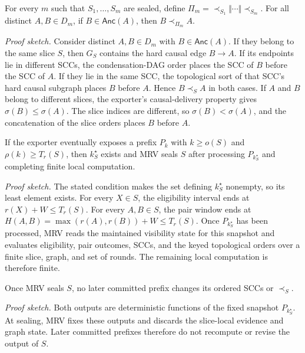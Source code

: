 \begin{theorem}
\label{thm:global_causal_refinement}
For every $m$ such that $S_1,\ldots,S_m$ are sealed, define $\Pi_m=\prec_{S_1}\Vert\cdots\Vert\prec_{S_m}$. For all distinct
$A,B\in D_m$, if $B\in\mathsf{Anc}(A)$, then $B\prec_{\Pi_m}A$.
\end{theorem}
\noindent\emph{Proof sketch.}
Consider distinct $A,B\in D_m$ with $B\in\mathsf{Anc}(A)$. If they belong to the same slice $S$, then $G_S$ contains the hard causal edge $B\to A$. If its endpoints lie in different SCCs, the condensation-DAG order places the SCC of $B$ before the SCC of $A$. If they lie in the same SCC, the topological sort of that SCC's hard causal subgraph places $B$ before $A$. Hence $B\prec_S A$ in both cases. If $A$ and $B$ belong to different slices, the
exporter's causal-delivery property gives $\sigma(B)\leq\sigma(A)$. The slice indices are different, so
$\sigma(B)<\sigma(A)$, and the concatenation of the slice orders places $B$ before $A$.

\begin{theorem}
\label{thm:conditional_sealing}
If the exporter eventually exposes a prefix $P_k$ with $k\geq o(S)$ and $\rho(k)\geq T_r(S)$, then $k^\star_S$ exists and MRV seals $S$ after processing $P_{k^\star_S}$ and completing finite local computation.
\end{theorem}
\noindent\emph{Proof sketch.}
The stated condition makes the set defining $k^\star_S$ nonempty, so its least element exists. For every $X\in S$, the eligibility interval ends at $r(X)+W\leq T_r(S)$. For every $A,B\in S$, the pair window ends at $H(A,B)=\max(r(A),r(B))+W\leq T_r(S)$. Once
$P_{k^\star_S}$ has been processed, MRV reads the maintained visibility state for this snapshot and evaluates eligibility, pair outcomes, SCCs, and the keyed topological orders over a finite slice, graph, and set of rounds. The remaining local computation is therefore finite.

\begin{corollary}[No Rollback]
\label{cor:no_rollback}
Once MRV seals $S$, no later committed prefix changes its ordered SCCs or $\prec_S$.
\end{corollary}
\noindent\emph{Proof sketch.}
Both outputs are deterministic functions of the fixed snapshot
$P_{k^\star_S}$. At sealing, MRV fixes these outputs and discards the slice-local evidence and graph state. Later committed prefixes therefore do not recompute or revise the output of $S$.

